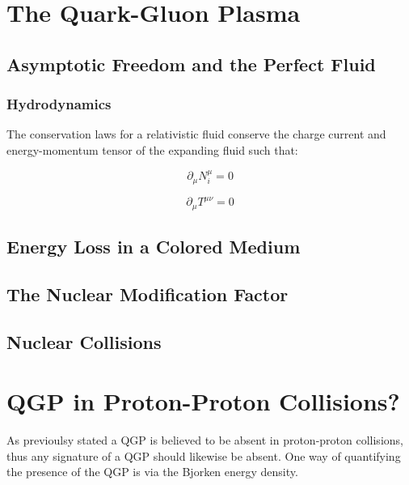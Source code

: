 
\section{The Quark-Gluon Plasma}

\subsection{Asymptotic Freedom and the Perfect Fluid}

\subsubsection{Hydrodynamics}
The conservation laws for a relativistic fluid conserve the charge current and energy-momentum tensor of the expanding fluid such that:

\begin{equation}
\partial_{\mu} N_{\textit{i}}^{\mu} = 0
\label{eq:hydrochrg}
\end{equation}

\begin{equation}
\partial_{\mu} T^{\mu \nu} = 0
\label{eq:hydroenrgy}
\end{equation}

\subsection{Energy Loss in a Colored Medium}

\subsection{The Nuclear Modification Factor}

\subsection{Nuclear Collisions}


\section{QGP in Proton-Proton Collisions?}
As previoulsy stated a QGP is believed to be absent in proton-proton collisions, thus any signature of a QGP should likewise be absent.  One way of quantifying the presence of the QGP is via the Bjorken energy density.  

